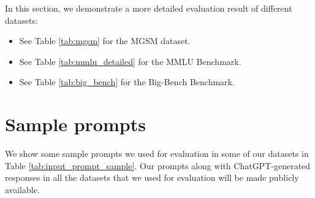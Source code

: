 \documentclass[11pt]{article}
\begin{document}
In this section, we demonstrate a more detailed evaluation result of different datasets:

\begin{itemize}
    \item See Table \ref{tab:mgsm} for the MGSM dataset.
    \item See Table \ref{tab:mmlu_detailed} for the MMLU Benchmark.
    \item See Table \ref{tab:big_bench} for the Big-Bench Benchmark.
\end{itemize}

\section{Sample prompts}
\label{appendix:inputprompt}

We show some sample prompts we used for evaluation in some of our datasets in Table \ref{tab:input_prompt_sample}. Our prompts along with ChatGPT-generated responses in all the datasets that we used for evaluation will be made publicly available.
\end{document}
